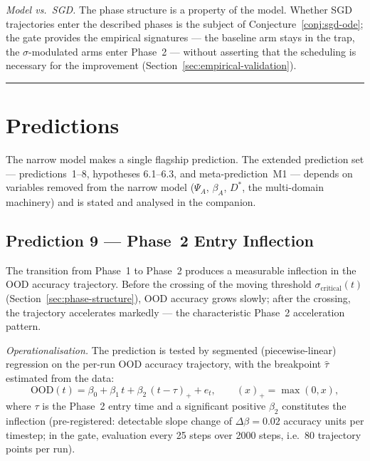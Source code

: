 \documentclass{article}
\theoremstyle{definition}
\begin{document}
\noindent\emph{Model vs.\ SGD.} The phase structure is a property of
the model. Whether SGD trajectories enter the described phases is the
subject of Conjecture~\ref{conj:sgd-ode}; the gate provides the
empirical signatures --- the baseline arm stays in the trap, the
$\sigma$-modulated arms enter Phase~2 --- without asserting that the
scheduling is necessary for the improvement
(Section~\ref{sec:empirical-validation}).

\noindent\rule{\linewidth}{0.4pt}

\section{Predictions}\label{sec:predictions}

The narrow model makes a single flagship prediction. The extended
prediction set --- predictions~1--8, hypotheses 6.1--6.3, and
meta-prediction~M1 --- depends on variables removed from the narrow
model ($\Psi_A$, $\beta_A$, $D^*$, the multi-domain machinery) and is
stated and analysed in the companion.

\subsection{Prediction 9 --- Phase~2 Entry Inflection}

The transition from Phase~1 to Phase~2 produces a measurable inflection
in the OOD accuracy trajectory. Before the crossing of the moving
threshold $\sigma_{\text{critical}}(t)$
(Section~\ref{sec:phase-structure}), OOD accuracy grows slowly; after
the crossing, the trajectory accelerates markedly --- the
characteristic Phase~2 acceleration pattern.

\noindent\emph{Operationalisation.} The prediction is tested by
segmented (piecewise-linear) regression on the per-run OOD accuracy
trajectory, with the breakpoint $\hat{\tau}$ estimated from the data:
\[
\text{OOD}(t) = \beta_0 + \beta_1\, t + \beta_2\, (t - \tau)_+ + e_t,
\qquad (x)_+ = \max(0, x),
\]
where $\tau$ is the Phase~2 entry time and a significant positive
$\beta_2$ constitutes the inflection (pre-registered: detectable slope
change of $\Delta\beta = 0.02$ accuracy units per timestep; in the gate,
evaluation every 25 steps over 2000 steps, i.e.\ 80 trajectory points
per run).
\end{document}
